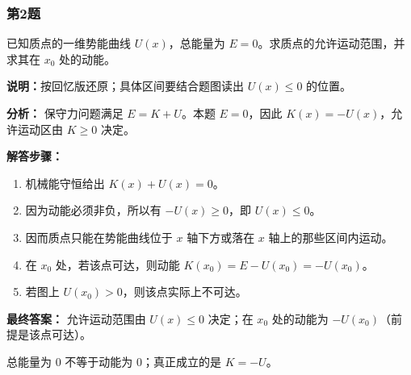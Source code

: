 \documentclass[12pt,a4paper]{ctexart}
\begin{document}
\subsubsection*{第2题}
\begin{tcolorbox}[colback=gray!2!white,colframe=black!60,title={题目}]
已知质点的一维势能曲线 \(U(x)\)，总能量为 \(E=0\)。求质点的允许运动范围，并求其在 \(x_0\) 处的动能。\par
\vspace{0.4em}
\textbf{说明：}按回忆版还原；具体区间要结合题图读出 \(U(x)\le 0\) 的位置。\par
\end{tcolorbox}
\begin{tcolorbox}[colback=blue!2!white,colframe=blue!55!black,title={完整答案}]
\textbf{分析：}
保守力问题满足 \(E=K+U\)。本题 \(E=0\)，因此 \(K(x)=-U(x)\)，允许运动区由 \(K\ge 0\) 决定。\par
\textbf{解答步骤：}
\begin{enumerate}
\item 机械能守恒给出 \(K(x)+U(x)=0\)。
\item 因为动能必须非负，所以有 \(-U(x)\ge 0\)，即 \(U(x)\le 0\)。
\item 因而质点只能在势能曲线位于 \(x\) 轴下方或落在 \(x\) 轴上的那些区间内运动。
\item 在 \(x_0\) 处，若该点可达，则动能 \(K(x_0)=E-U(x_0)=-U(x_0)\)。
\item 若图上 \(U(x_0)>0\)，则该点实际上不可达。
\end{enumerate}
\textbf{最终答案：}
允许运动范围由 \(U(x)\le 0\) 决定；在 \(x_0\) 处的动能为 \(-U(x_0)\)（前提是该点可达）。\par
\end{tcolorbox}
\begin{tcolorbox}[colback=red!2!white,colframe=red!55!black,title={易错点}]
总能量为 0 不等于动能为 0；真正成立的是 \(K=-U\)。\par
\end{tcolorbox}
\end{document}
